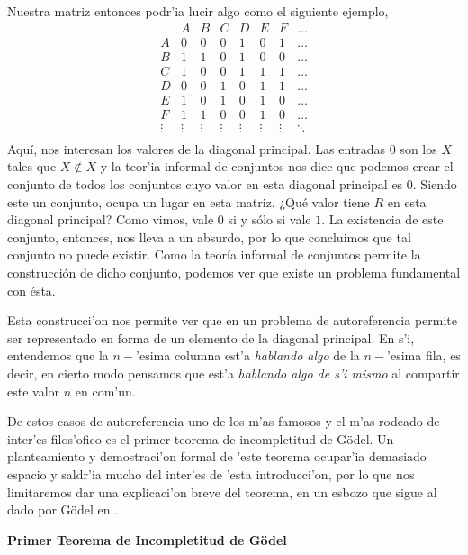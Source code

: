 Nuestra matriz entonces podr'ia lucir algo como el siguiente ejemplo, 
\[
\begin{matrix}
    & A & B & C & D & E & F & \dots\\
    A &  0 & 0 & 0 &1 & 0 &1 & \dots\\
    B & 1 & 1 & 0 &1 &  0 & 0 & \dots\\
    C&  1 & 0 & 0 & 1 & 1 & 1 & \dots\\
    D& 0 & 0 & 1 & 0 & 1 & 1 & \dots \\
    E& 1 & 0 & 1 & 0 &1 & 0 & \dots\\
    F& 1 & 1 & 0 & 0 & 1 & 0 & \dots\\
    \vdots & \vdots & \vdots & \vdots & \vdots & \vdots & \vdots & \ddots\\
\end{matrix}\]
Aquí, nos interesan los valores de la diagonal principal. Las entradas $0$ son los $X$ tales que $X\notin X$ y la teor'ia informal de conjuntos nos dice que podemos crear el conjunto de todos los conjuntos cuyo valor en esta diagonal principal es $0$. Siendo este un conjunto, ocupa un lugar en esta matriz. ¿Qué valor tiene $R$ en esta diagonal principal? Como vimos, vale $0$ si y sólo si vale $1$. La existencia de este conjunto, entonces, nos lleva a un absurdo, por lo que concluimos que tal conjunto no puede existir. Como la teoría informal de conjuntos permite la construcción de dicho conjunto, podemos ver que existe un problema fundamental con ésta.

Esta construcci'on nos permite ver que en un problema de autoreferencia permite ser representado en forma de un elemento de la diagonal principal. En s'i, entendemos que la $n-$'esima columna est'a \emph{hablando algo} de la $n-$'esima fila, es decir, en cierto modo pensamos que est'a \emph{hablando algo de s'i mismo} al compartir este valor $n$ en com'un. 

De estos casos de autoreferencia uno de los m'as famosos y el m'as rodeado de inter'es filos'ofico es el primer teorema de incompletitud de Gödel. Un planteamiento y demostraci'on formal de 'este teorema ocupar'ia demasiado espacio y saldr'ia mucho del inter'es de 'esta introducci'on, por lo que nos limitaremos dar una explicaci'on breve del teorema, en un esbozo que sigue al dado por Gödel en \parencite{gdl}.

\textbf{Primer Teorema de Incompletitud de Gödel}

